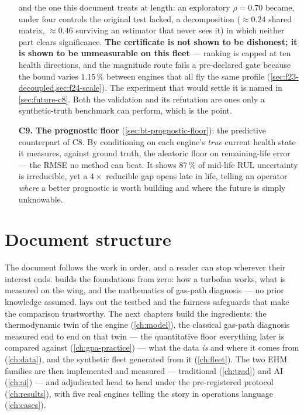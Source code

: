 \begin{enumerate}
    and the one this document treats at length: an exploratory $\rho = 0.70$ became, under
    four controls the original test lacked, a decomposition ($\approx 0.24$ shared matrix,
    $\approx 0.46$ surviving an estimator that never sees it) in which neither part clears
    significance. \textbf{The certificate is not shown to be dishonest; it is shown to be
    unmeasurable on this fleet} --- ranking is capped at ten health directions, and the
    magnitude route fails a pre-declared gate because the bound varies $1.15\,\%$ between
    engines that all fly the same profile (\cref{sec:f23-decoupled,sec:f24-scale}). The
    experiment that would settle it is named in \cref{sec:future-c8}. Both the validation and
    its refutation are ones only a synthetic-truth benchmark can perform, which is the point.
  \item[\textbf{C9.}] \textbf{The prognostic floor} (\cref{sec:bt-prognostic-floor}): the
    predictive counterpart of C8. By conditioning on each engine's \emph{true} current health
    state it measures, against ground truth, the aleatoric floor on remaining-life error --- the
    RMSE no method can beat. It shows $87\,\%$ of mid-life RUL uncertainty is irreducible, yet a
    $4\times$ reducible gap opens late in life, telling an operator \emph{where} a better
    prognostic is worth building and where the future is simply unknowable.
\end{enumerate}

\section{Document structure}

The document follows the work in order, and a reader can stop wherever their interest ends.
 builds the foundations from zero: how a turbofan works, what is measured
on the wing, and the mathematics of gas-path diagnosis --- no prior knowledge assumed.
 lays out the testbed and the fairness safeguards that make the
comparison trustworthy. The next chapters build the ingredients: the thermodynamic twin
of the engine (\cref{ch:model}), the classical gas-path diagnosis measured end to end on that
twin --- the quantitative floor everything later is compared against
(\cref{ch:gpa-practice}) --- what the data \emph{is} and where it comes from
(\cref{ch:data}), and the synthetic fleet generated from it (\cref{ch:fleet}). The two EHM
families are then implemented and measured --- traditional (\cref{ch:trad}) and AI
(\cref{ch:ai}) --- and adjudicated head to head under the pre-registered protocol
(\cref{ch:results}), with five real engines telling the story in operations language
(\cref{ch:cases}).

